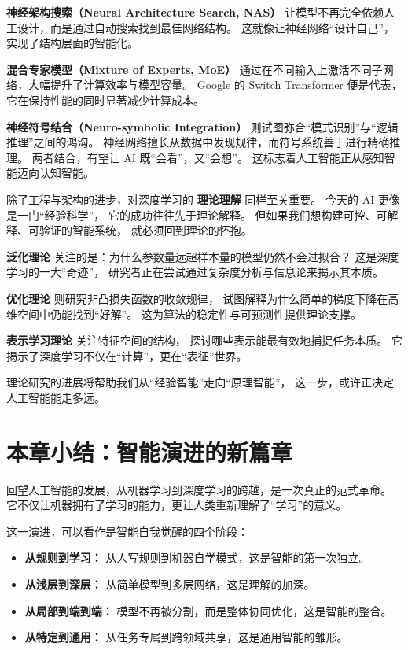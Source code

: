 {\bf 神经架构搜索（Neural Architecture Search, NAS）}  
让模型不再完全依赖人工设计，而是通过自动搜索找到最佳网络结构。  
这就像让神经网络“设计自己”，实现了结构层面的智能化。  

{\bf 混合专家模型（Mixture of Experts, MoE）}  
通过在不同输入上激活不同子网络，大幅提升了计算效率与模型容量。  
Google 的 Switch Transformer 便是代表，它在保持性能的同时显著减少计算成本。  

{\bf 神经符号结合（Neuro-symbolic Integration）}  
则试图弥合“模式识别”与“逻辑推理”之间的鸿沟。  
神经网络擅长从数据中发现规律，而符号系统善于进行精确推理。  
两者结合，有望让 AI 既“会看”，又“会想”。  
这标志着人工智能正从感知智能迈向认知智能。

除了工程与架构的进步，对深度学习的 {\bf 理论理解} 同样至关重要。  
今天的 AI 更像是一门“经验科学”，  
它的成功往往先于理论解释。  
但如果我们想构建可控、可解释、可验证的智能系统，  
就必须回到理论的怀抱。  

{\bf 泛化理论} 关注的是：为什么参数量远超样本量的模型仍然不会过拟合？  
这是深度学习的一大“奇迹”，  
研究者正在尝试通过复杂度分析与信息论来揭示其本质。  

{\bf 优化理论} 则研究非凸损失函数的收敛规律，  
试图解释为什么简单的梯度下降在高维空间中仍能找到“好解”。  
这为算法的稳定性与可预测性提供理论支撑。  

{\bf 表示学习理论} 关注特征空间的结构，  
探讨哪些表示能最有效地捕捉任务本质。  
它揭示了深度学习不仅在“计算”，更在“表征”世界。  

理论研究的进展将帮助我们从“经验智能”走向“原理智能”，  
这一步，或许正决定人工智能能走多远。

\section{本章小结：智能演进的新篇章}

回望人工智能的发展，从机器学习到深度学习的跨越，是一次真正的范式革命。  
它不仅让机器拥有了学习的能力，更让人类重新理解了“学习”的意义。  

这一演进，可以看作是智能自我觉醒的四个阶段：  
\begin{itemize}
\item {\bf 从规则到学习：} 从人写规则到机器自学模式，这是智能的第一次独立。  
\item {\bf 从浅层到深层：} 从简单模型到多层网络，这是理解的加深。  
\item {\bf 从局部到端到端：} 模型不再被分割，而是整体协同优化，这是智能的整合。  
\item {\bf 从特定到通用：} 从任务专属到跨领域共享，这是通用智能的雏形。  
\end{itemize}

